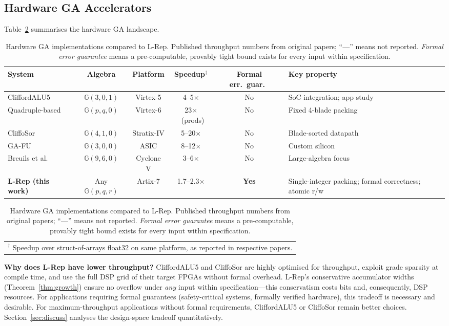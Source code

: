 \documentclass[11pt,a4paper]{article}
\theoremstyle{definition}
\theoremstyle{plain}
\theoremstyle{remark}
\newcommand{\GA}{\mathbb{G}}
\begin{document}
\subsection{Hardware GA Accelerators}
\label{sec:related-hw}

Table~\ref{tab:related-hw} summarises the hardware GA landscape.

\begin{table}[h]
\centering
\caption{Hardware GA implementations compared to L-Rep. Published
throughput numbers from original papers; ``---'' means not reported.
\emph{Formal error guarantee} means a pre-computable, provably tight
bound exists for every input within specification.}
\label{tab:related-hw}
\small
\begin{tabular}{lccccp{3.2cm}}
\toprule
System & Algebra & Platform & Speedup$^\dagger$ & Formal err.\ guar.\ & Key property \\
\midrule
CliffordALU5~\cite{cliffordalu5} & $\GA(3,0,1)$ & Virtex-5 & 4--5$\times$ & No & SoC integration; app study \\
Quadruple-based~\cite{quadrupleGA} & $\GA(p,q,0)$ & Virtex-6 & 23$\times$~(prods) & No & Fixed 4-blade packing \\
CliffoSor~\cite{cliffosor} & $\GA(4,1,0)$ & Stratix-IV & 5--20$\times$ & No & Blade-sorted datapath \\
GA-FU~\cite{gafu} & $\GA(3,0,0)$ & ASIC & 8--12$\times$ & No & Custom silicon \\
Breuils et al.~\cite{breuils2017} & $\GA(9,6,0)$ & Cyclone V & 3--6$\times$ & No & Large-algebra focus \\
\midrule
\textbf{L-Rep (this work)} & Any $\GA(p,q,r)$ & Artix-7 & 1.7--2.3$\times$ & \textbf{Yes} & Single-integer packing; formal correctness; atomic r/w \\
\bottomrule
\end{tabular}
\begin{tabular}{l}
\small $^\dagger$ Speedup over struct-of-arrays float32 on same platform, as reported in respective papers.
\end{tabular}
\end{table}

\textbf{Why does L-Rep have lower throughput?}
CliffordALU5 and CliffoSor are highly optimised for throughput,
exploit grade sparsity at compile time, and use the full DSP grid of
their target FPGAs without formal overhead.
L-Rep's conservative accumulator widths (Theorem~\ref{thm:growth})
ensure no overflow under \emph{any} input within specification---this
conservatism costs bits and, consequently, DSP resources.
For applications requiring formal guarantees (safety-critical systems,
formally verified hardware), this tradeoff is necessary and desirable.
For maximum-throughput applications without formal requirements,
CliffordALU5 or CliffoSor remain better choices.
Section~\ref{sec:discuss} analyses the design-space tradeoff quantitatively.
\end{document}
